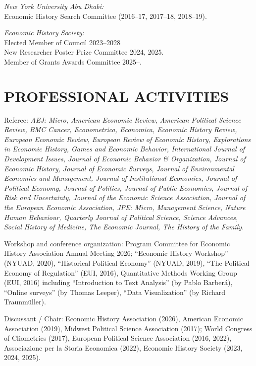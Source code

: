 \documentclass{res}  %
\begin{document}
\begin{resume}
\textit{New York University Abu Dhabi:}  \\
Economic History Search Committee (2016--17, 2017--18, 2018--19).

\textit{Economic History Society:}  \\
Elected Member of Council 2023--2028 \\
New Researcher Poster Prize Committee 2024, 2025. \\
Member of Grants Awards Committee 2025--.

\section{PROFESSIONAL ACTIVITIES}
Referee: \textit{AEJ: Micro, American Economic Review, American Political Science Review, BMC Cancer, Econometrica, Economica, Economic History Review, European Economic Review, European Review of Economic History, Explorations in Economic History, Games and Economic Behavior, International Journal of Development Issues, Journal of Economic Behavior \& Organization, Journal of Economic History, Journal of Economic Surveys, Journal of Environmental Economics and Management, Journal of Institutional Economics, Journal of Political Economy, Journal of Politics, Journal of Public Economics, Journal of Risk and Uncertainty, Journal of the Economic Science Association, Journal of the European Economic Association, JPE: Micro, Management Science, Nature Human Behaviour, Quarterly Journal of Political Science, Science Advances, Social History of Medicine, The Economic Journal, The History of the Family.}

Workshop and conference organization: Program Committee for Economic History Association Annual Meeting 2026; ``Economic History Workshop'' (NYUAD, 2020), ``Historical Political Economy'' (NYUAD, 2019), ``The Political Economy of Regulation'' (EUI, 2016), Quantitative Methods Working Group (EUI, 2016) including ``Introduction to Text Analysis'' (by Pablo Barber\'{a}), ``Online surveys'' (by Thomas Leeper), ``Data Visualization'' (by Richard Traunm\"{u}ller).

Discussant / Chair: Economic History Association (2026), American Economic Association (2019), Midwest Political Science Association (2017); World Congress of Cliometrics (2017), European Political Science Association (2016, 2022), Associazione per la Storia Economica (2022), Economic History Society (2023, 2024, 2025).


\end{resume}
\end{document}
